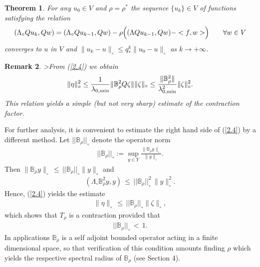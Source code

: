 \documentclass[amstex,amstext,amsfonts,epsf,12pt] {amsart}
\newtheorem{theorem}{Theorem}[section]
\newtheorem{remark}[theorem]{Remark}
\newcommand\be{\begin{eqnarray*}}
\newcommand\ee{\end{eqnarray*}}
\newcommand\ben{\begin{eqnarray}}
\newcommand\een{\end{eqnarray}}
\def\be{\begin{eqnarray*}}
\def\ee{\end{eqnarray*}}
\def\ben{\begin{eqnarray}}
\def\een{\end{eqnarray}}
\def\NNN {{\boldsymbol{ |}\!\!|}}
\begin{document}
\begin{theorem}
\label{th1}
For any $u_0\in V$
and $\rho=\rho^*$   the  sequence $\{u_k\}\in V$ of functions satisfying the relation
\ben
\label{2.9}
(\Lambda_\circ Q u_k, Qw)=(\Lambda_\circ Qu_{k-1}, Qw) - \rho \Bigl( (\Lambda Q u_{k-1}, Qw)-
<f,w>\Bigr) \qquad \forall w\in V
\een
converges
to $u$ in $V$ and
$\|u_k-u\|_\circ
\leq q^k_*\|u_0-u\|_\circ$
as $k\rightarrow+\infty$.
\end{theorem}
\begin{remark}
>From (\ref{2.4}) we obtain
\be
\|\eta\|^2_\circ
\leq \frac{1}{\lambda_{0,{\rm min}}}\|{\mathbb B}^2_\rho Q\zeta\|\|\zeta\|_\circ\leq 
\frac{\|{\mathbb B}^2_\rho\|}{\lambda^2_{0,{\rm min}}}\|\zeta\|^2_\circ.
\ee
This relation yields a simple (but not very sharp) estimate
of the contraction factor.
\end{remark}
For further analysis, it is convenient 
to estimate the right hand side of (\ref{2.4}) by a different method.
Let $\NNN {\mathbb B}_\rho\NNN_\circ $ denote the operator
norm
\ben
\label{2.10}
\NNN {\mathbb B}_\rho\NNN_\circ:=\sup\limits_{y\in Y}
\frac{\| {\mathbb B}_\rho y\|_\circ}{\| y\|_\circ}.
\een
Then
$
\| {\mathbb B}_\rho y\|_\circ\,\leq\,\NNN {\mathbb B}_\rho\NNN_\circ
 \|y\|_\circ
$
and
\be
(\Lambda_\circ{\mathbb B}^2_\rho y,y)\,
\leq\,\NNN {\mathbb B}_\rho\NNN^2_\circ\,\| y\|^2_\circ.
\ee
Hence, (\ref{2.4}) yields the estimate
\ben
\label{2.11}
\|\eta\|_\circ\,\leq\,
\NNN {\mathbb B}_\rho\NNN_\circ \|\zeta\|_\circ,
\een
which shows that $T_\rho$ is a contraction provided that
\ben
\label{2.12}
\NNN {\mathbb B}_\rho\NNN_\circ\,<\,1.
\een
In applications ${\mathbb B}_\rho$ is a self adjoint bounded
operator acting in a finite dimensional space, so that verification of this condition
amounts finding $\rho$ which yields the respective
spectral radius of ${\mathbb B}_\rho$ (see Section 4).

 
\end{document}
